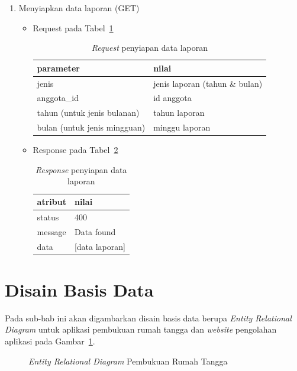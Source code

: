 \begin{enumerate}
		\item Menyiapkan data laporan (GET)
		\begin{itemize}
			\item Request pada Tabel~\ref{tab:request_laporan}
				\begin{table}[h]
					\centering
						\begin{tabular}{ |p{4cm}|p{10cm}|}
							\hline
							parameter & nilai \\ \hline
							jenis & jenis laporan (tahun \& bulan) \\ \hline
							anggota\_id & id anggota \\ \hline
							tahun (untuk jenis bulanan) & tahun laporan \\ \hline
							bulan (untuk jenis mingguan) & minggu laporan \\ \hline
					\end{tabular}
					\caption{\textit{Request} penyiapan data laporan}
					\label{tab:request_laporan}
				\end{table}
			\item Response pada Tabel~\ref{tab:response_laporan}
				\begin{table}[h]
					\centering
						\begin{tabular}{ |p{4cm}|p{10cm}|}
							\hline
							atribut & nilai \\ \hline
							status & 400\\ \hline
							message & Data found \\ \hline
							data & [data laporan] \\ \hline
						\end{tabular}
						\caption{\textit{Response} penyiapan data laporan}
					\label{tab:response_laporan}
				\end{table}
		\end{itemize}
\end{enumerate}

\section{Disain Basis Data}
\label{sec:disainbasisdata}

\hspace{0,5cm}Pada sub-bab ini akan digambarkan disain basis data berupa \textit{Entity Relational Diagram} untuk aplikasi pembukuan rumah tangga dan \textit{website} pengolahan aplikasi pada Gambar~\ref{fig:er_diagram_prt}.

\begin{figure}[h]
\centering
{}
\caption[\textit{Entity Relational Diagram} Pembukuan Rumah Tangga]{\textit{Entity Relational Diagram} Pembukuan Rumah Tangga} 
\label{fig:er_diagram_prt}
\end{figure}


